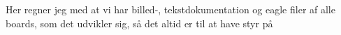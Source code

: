 Her regner jeg med at vi har billed-, tekstdokumentation og eagle filer af alle boards, som det udvikler sig, så det altid er til at have styr på
